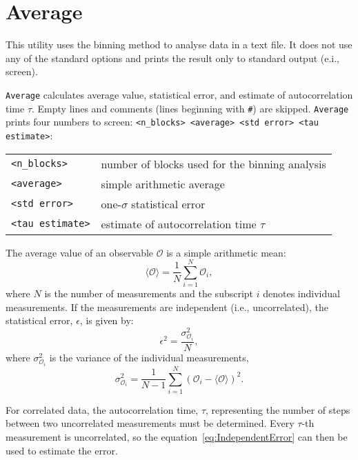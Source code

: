 \section{Average} \label{sec:Average}

This utility uses the binning method to analyse data in a text file. It
does not use any of the standard options and prints the result only to
standard output (e.i., screen).

\texttt{Average} calculates average value, statistical error, and estimate
of autocorrelation time $\tau$. Empty lines and comments (lines beginning
with \texttt{\#}) are skipped. \texttt{Average} prints four numbers to
screen: \texttt{<n\_blocks> <average> <std error> <tau estimate>}:
\begin{longtable}{ll}
  \toprule
  \texttt{<n\_blocks>} & number of blocks used for the binning analysis \\
  \texttt{<average>} & simple arithmetic average \\
  \texttt{<std error>} & one-$\sigma$ statistical error \\
  \texttt{<tau estimate>} & estimate of autocorrelation time $\tau$ \\
  \bottomrule
\end{longtable}

The average value of an observable $\mathcal{O}$ is a simple arithmetic
mean:
\begin{equation} \label{eq:Average} %
  \langle\mathcal{O}\rangle = \frac{1}{N} \sum^N_{i=1} \mathcal{O}_i,
\end{equation} %
where $N$ is the number of measurements and the subscript $i$ denotes
individual measurements. If the measurements are independent (i.e.,
uncorrelated), the statistical error, $\epsilon$, is given by:
\begin{equation} \label{eq:IndependentError} %
  \epsilon^2 =
    \frac{\sigma^2_{\mathcal{O}_i}}{N},
\end{equation} %
where $\sigma^2_{\mathcal{O}_i}$
is the variance of the individual
measurements,
\begin{equation} %
  \sigma^2_{\mathcal{O}_i} = \frac{1}{N-1} \sum^N_{i=1} (\mathcal{O}_i -
  \langle\mathcal{O}\rangle)^2.
\end{equation} %

For correlated data, the autocorrelation time,
$\tau$, representing the number of steps between two uncorrelated
measurements must be determined. Every
$\tau$-th measurement is uncorrelated, so the
equation~\eqref{eq:IndependentError} can then be used to estimate the
error.

